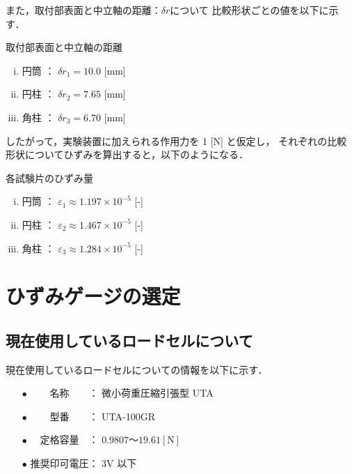 \documentclass[twocolumn,a4j]{jsarticle}
\begin{document}
また，取付部表面と中立軸の距離：$\delta r$について
比較形状ごとの値を以下に示す．


\begin{itembox}[l]{取付部表面と中立軸の距離}
    \begin{enumerate}[(i)]
        \item 円筒 ： $\delta r_1 = 10.0$ [mm]
        \item 円柱 ： $\delta r_2 = 7.65$ [mm]
        \item 角柱 ： $\delta r_3 = 6.70$ [mm]
    \end{enumerate}
\end{itembox}

したがって，実験装置に加えられる作用力を 1 [N] と仮定し，
それぞれの比較形状についてひずみを算出すると，以下のようになる．

\begin{itembox}[l]{各試験片のひずみ量}
    \begin{enumerate}[(i)]
        \item 円筒 ： $\varepsilon_1 \approx 1.197 × 10^{-5}$ [-]
        \item 円柱 ： $\varepsilon_2 \approx 1.467 × 10^{-5}$ [-]
        \item 角柱 ： $\varepsilon_3 \approx 1.284 × 10^{-5}$ [-]
    \end{enumerate}
\end{itembox}

\section{ひずみゲージの選定}

\subsection{現在使用しているロードセルについて}
現在使用しているロードセルについての情報を以下に示す．

\begin{screen}
    \begin{itemize}
        \item [$\bullet$] 　　名称　　： 微小荷重圧縮引張型 UTA
        \item [$\bullet$] 　　型番　　： UTA-100GR
        \item [$\bullet$] 　定格容量　： $0.9807 ～ 19.61 \left[\mathrm{N}\right]$
        \item [$\bullet$] 推奨印可電圧： 3V 以下
    \end{itemize}
\end{screen}
\end{document}
